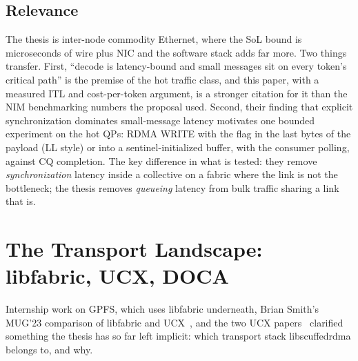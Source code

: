 \documentclass[11pt,letterpaper]{article}
\begin{document}
\subsection{Relevance}

The thesis is inter-node commodity Ethernet, where the SoL bound is microseconds of wire plus NIC and the software stack adds far more. Two things transfer. First, ``decode is latency-bound and small messages sit on every token's critical path'' is the premise of the hot traffic class, and this paper, with a measured ITL and cost-per-token argument, is a stronger citation for it than the NIM benchmarking numbers the proposal used. Second, their finding that explicit synchronization dominates small-message latency motivates one bounded experiment on the hot QPs: RDMA WRITE with the flag in the last bytes of the payload (LL style) or into a sentinel-initialized buffer, with the consumer polling, against CQ completion. The key difference in what is tested: they remove \emph{synchronization} latency inside a collective on a fabric where the link is not the bottleneck; the thesis removes \emph{queueing} latency from bulk traffic sharing a link that is.

\section{The Transport Landscape: libfabric, UCX, DOCA}

Internship work on GPFS, which uses libfabric underneath, Brian Smith's MUG'23 comparison of libfabric and UCX~\cite{smith_mug23}, and the two UCX papers~\cite{shamis2015,papadopoulou2017} clarified something the thesis has so far left implicit: which transport stack libscuffedrdma belongs to, and why.
\end{document}
